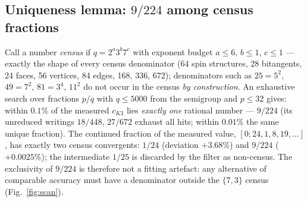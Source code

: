 \documentclass[11pt,a4paper]{article}
\theoremstyle{definition}
\theoremstyle{remark}
\begin{document}
\begin{table}[htbp]
\centering
\small
\caption{Provenance: all exact appearances of $224$ and $672$ in the census
of $\{7,3\}$ and the Hurwitz tower.}
\label{tab:prov}
\end{table}

\subsection{Uniqueness lemma: $9/224$ among census fractions}

Call a number \emph{census} if $q = 2^a 3^b 7^c$ with exponent budget
$a \le 6$, $b \le 1$, $c \le 1$ --- exactly the shape of every census
denominator (64 spin structures, 28 bitangents, 24 faces, 56 vertices,
84 edges, 168, 336, 672); denominators such as $25 = 5^2$, $49 = 7^2$,
$81 = 3^4$, $11^2$ do not occur in the census \emph{by construction}. An
exhaustive search over fractions $p/q$ with $q \le 5000$ from the semigroup
and $p \le 32$ gives: within $0.1\%$ of the measured $c_{K3}$ lies
\emph{exactly one} rational number --- $9/224$ (its unreduced writings
$18/448$, $27/672$ exhaust all hits; within $0.01\%$ the same unique
fraction). The continued fraction of the measured value,
$[0; 24, 1, 8, 19, \ldots]$, has exactly two census convergents: $1/24$
(deviation $+3.68\%$) and $9/224$ ($+0.0025\%$); the intermediate $1/25$ is
discarded by the filter as non-census. The exclusivity of $9/224$ is
therefore not a fitting artefact: any alternative of comparable accuracy
must have a denominator outside the $\{7,3\}$ census (Fig.~\ref{fig:scan}).
\end{document}
